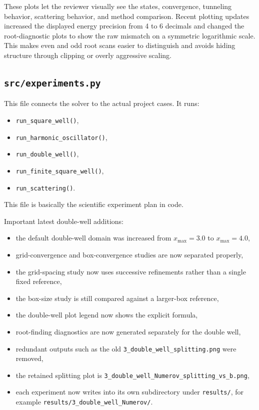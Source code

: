 \documentclass[11pt]{article}
\begin{document}
    These plots let the reviewer visually see the states, convergence, tunneling behavior, scattering behavior, and method comparison. Recent plotting updates increased the displayed energy precision from 4 to 6 decimals and changed the root-diagnostic plots to show the raw mismatch on a symmetric logarithmic scale. This makes even and odd root scans easier to distinguish and avoids hiding structure through clipping or overly aggressive scaling.

    \subsection{\texttt{src/experiments.py}}

    This file connects the solver to the actual project cases. It runs:
    \begin{itemize}
        \item \texttt{run\_square\_well()},
        \item \texttt{run\_harmonic\_oscillator()},
        \item \texttt{run\_double\_well()},
        \item \texttt{run\_finite\_square\_well()},
        \item \texttt{run\_scattering()}.
    \end{itemize}

    This file is basically the scientific experiment plan in code.

    Important latest double-well additions:
    \begin{itemize}
        \item the default double-well domain was increased from $x_{\max}=3.0$ to $x_{\max}=4.0$,
        \item grid-convergence and box-convergence studies are now separated properly,
        \item the grid-spacing study now uses successive refinements rather than a single fixed reference,
        \item the box-size study is still compared against a larger-box reference,
        \item the double-well plot legend now shows the explicit formula,
        \item root-finding diagnostics are now generated separately for the double well,
        \item redundant outputs such as the old \texttt{3\_double\_well\_splitting.png} were removed,
        \item the retained splitting plot is \texttt{3\_double\_well\_Numerov\_splitting\_vs\_b.png},
        \item each experiment now writes into its own subdirectory under \texttt{results/}, for example \texttt{results/3\_double\_well\_Numerov/}.
    \end{itemize}
\end{document}
